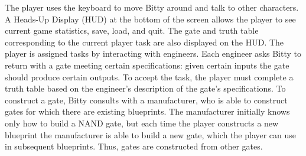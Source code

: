 The player uses the keyboard to move Bitty around and talk to other characters.  A Heads-Up Display (HUD) at the bottom of the screen allows the player to see current game statistics, save, load, and quit.  The gate and truth table corresponding to the current player task are also displayed on the HUD.
The player is assigned tasks by interacting with engineers.  Each engineer asks Bitty to return with a gate meeting certain specifications:  given certain inputs the gate should produce certain outputs.  To accept the task, the player must complete a truth table based on the engineer's description of the gate's specifications.  
To construct a gate, Bitty consults with a manufacturer, who is able to construct gates for which there are existing blueprints.  The manufacturer initially knows only how to build a NAND gate, but each time the player constructs a new blueprint the manufacturer is able to build a new gate, which the player can use in subsequent blueprints.  Thus, gates are constructed from other gates.